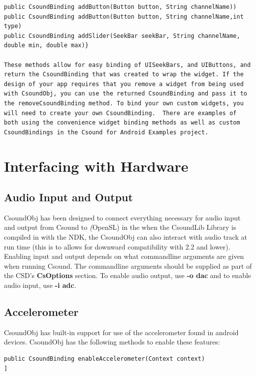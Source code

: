 \documentclass[11pt]{article}
\begin{document}
\begin{lstlisting}[caption=Methods for Widget Binding]
public CsoundBinding addButton(Button button, String channelName))
public CsoundBinding addButton(Button button, String channelName,int type)
public CsoundBinding addSlider(SeekBar seekBar, String channelName, double min, double max)}

These methods allow for easy binding of UISeekBars, and UIButtons, and return the CsoundBinding that was created to wrap the widget. If the design of your app requires that you remove a widget from being used with CsoundObj, you can use the returned CsoundBinding and pass it to the removeCsoundBinding method. To bind your own custom widgets, you will need to create your own CsoundBinding.  There are examples of both using the convenience widget binding methods as well as custom CsoundBindings in the Csound for Android Examples project.
\end{lstlisting}

\section{Interfacing with Hardware}
\subsection{Audio Input and Output}

CsoundObj has been designed to connect everything necessary for audio input and output from Csound to \textit(OpenSL) in the when the CsoundLib Library is compiled in with the NDK, the CsoundObj can also interact with audio track at run time (this is to allows for  downward compatibility with 2.2 and lower).  Enabling input and output depends on what commandline arguments are given when running Csound.  The commandline arguments should be supplied as part of the CSD's \textbf{CsOptions} section.  To enable audio output, use \textbf{-o dac} and to enable audio input, use \textbf{-i adc}. 

\subsection{Accelerometer}

CsoundObj has built-in support for use of the accelerometer found in android devices. CsoundObj has the following methods to enable these features:


\begin{lstlisting}[caption=CsoundObj Accelerometer Method]
public CsoundBinding enableAccelerometer(Context context)
]
\end{lstlisting}
\end{document}
